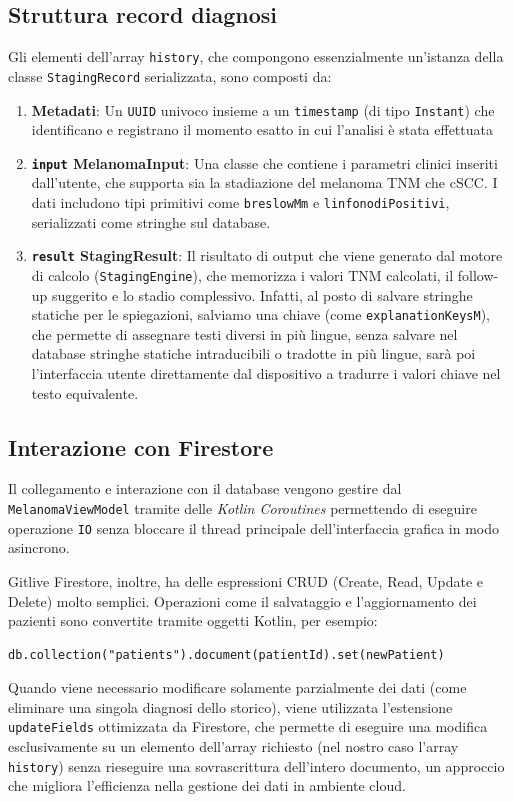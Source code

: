 \subsection{Struttura record diagnosi}\label{subsec:struttura-record-diagnosi}

Gli elementi dell'array \texttt{history}, che compongono essenzialmente un'istanza della classe \texttt{StagingRecord} serializzata,
sono composti da:

\begin{enumerate}
    \item \textbf{Metadati}: Un \texttt{UUID} univoco insieme a un \texttt{timestamp} (di tipo \texttt{Instant}) che identificano e registrano il momento
    esatto in cui l'analisi è stata effettuata
    \item \textbf{\texttt{input} MelanomaInput}: Una classe che contiene i parametri clinici inseriti dall'utente, che supporta sia la stadiazione del melanoma TNM che cSCC.
    I dati includono tipi primitivi come \texttt{breslowMm} e \texttt{linfonodiPositivi}, serializzati come stringhe sul database.
    \item \textbf{\texttt{result} StagingResult}: Il risultato di output che viene generato dal motore di calcolo (\texttt{StagingEngine}), che
    memorizza i valori TNM calcolati, il follow-up suggerito e lo stadio complessivo.
    Infatti, al posto di salvare stringhe statiche per le spiegazioni, salviamo una chiave (come \texttt{explanationKeysM}), che permette di
    assegnare testi diversi in più lingue, senza salvare nel database stringhe statiche intraducibili o tradotte in più lingue, sarà poi l'interfaccia utente
    direttamente dal dispositivo a tradurre i valori chiave nel testo equivalente.
\end{enumerate}

\subsection{Interazione con Firestore}\label{subsec:interazione-con-firestore}

Il collegamento e interazione con il database vengono gestire dal \texttt{MelanomaViewModel} tramite delle \textit{Kotlin Coroutines}
permettendo di eseguire operazione \texttt{IO} senza bloccare il thread principale dell'interfaccia grafica in modo asincrono.

Gitlive Firestore, inoltre, ha delle espressioni CRUD (Create, Read, Update e Delete) molto semplici.
Operazioni come il salvataggio e l'aggiornamento dei pazienti sono convertite tramite oggetti Kotlin, per esempio:
\begin{verbatim}
db.collection("patients").document(patientId).set(newPatient)
\end{verbatim}
Quando viene necessario modificare solamente parzialmente dei dati (come eliminare una singola diagnosi dello storico),
viene utilizzata l'estensione \texttt{updateFields} ottimizzata da Firestore, che permette di eseguire una modifica esclusivamente su un
elemento dell'array richiesto (nel nostro caso l'array \texttt{history}) senza rieseguire una sovrascrittura dell'intero documento,
un approccio che migliora l'efficienza nella gestione dei dati in ambiente cloud.
